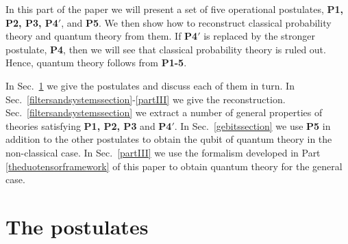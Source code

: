 \documentclass[10pt]{article}
\begin{document}
In this part of the paper we will present a set of five operational postulates, {\bf P1, P2, P3, P4}$'$, and {\bf P5}.  We then show how to reconstruct classical probability theory and quantum theory from them.  If {\bf P4}$'$ is replaced by the stronger postulate, {\bf P4}, then we will see that classical probability theory is ruled out.  Hence, quantum theory follows from {\bf P1-5}.

In Sec.\ \ref{thepostulates} we give the postulates and discuss each of them in turn.  In Sec.\ \ref{filtersandsystemssection}-\ref{partIII} we give the reconstruction.  Sec.\ \ref{filtersandsystemssection} we extract a number of general properties of theories satisfying {\bf P1, P2, P3} and {\bf P4}$'$.  In Sec.\ \ref{gebitssection} we use {\bf P5} in addition to the other postulates to obtain the qubit of quantum theory in the non-classical case.   In Sec.\ \ref{partIII} we use the formalism developed in Part \ref{theduotensorframework} of this paper to obtain quantum theory for the general case.



\section{The postulates}\label{thepostulates}
\end{document}
